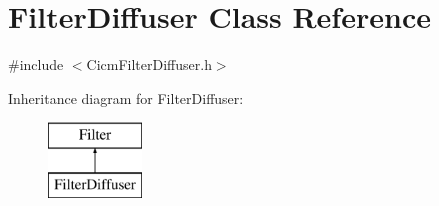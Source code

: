 \hypertarget{class_filter_diffuser}{\section{Filter\-Diffuser Class Reference}
\label{class_filter_diffuser}
}


{\ttfamily \#include $<$Cicm\-Filter\-Diffuser.\-h$>$}

Inheritance diagram for Filter\-Diffuser\-:\begin{figure}[H]
\begin{center}
\leavevmode
\includegraphics[height=2.000000cm]{class_filter_diffuser}
\end{center}
\end{figure}
